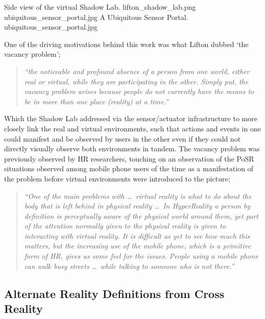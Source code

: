  {Side view of the virtual Shadow Lab.} {lifton_shadow_lab.png}
       {ubiquitous_sensor_portal.jpg} {A Ubiquitous Sensor Portal.} {ubiquitous_sensor_portal.jpg}

One of the driving motivations behind this work was what Lifton dubbed `the vacancy problem';

\begin{quote}
\textit{``the noticeable and profound absence of a person from one world, either real or virtual, while they are participating in the other. Simply put, the vacancy problem arises because people do not currently have the means to be in more than one place (reality) at a time.''}~\cite{Lifton2007a}
\end{quote}

Which the Shadow Lab addressed via the sensor/actuator infrastructure to more closely link the real and virtual environments, such that actions and events in one could manifest and be observed by users in the other even if they could not directly visually observe both environments in tandem. The vacancy problem was previously observed by HR researchers, touching on an observation of the PoSR situations observed among mobile phone users of the time as a manifestation of the problem before virtual environments were introduced to the picture; %

\begin{quote}
	\textit{``One of the main problems with \ldots\ virtual reality is what to do about the body that is left behind in physical reality \ldots\ In HyperReality a person by definition is perceptually aware of the physical world around them, yet part of the attention normally given to the physical reality is given to interacting with virtual reality. It is difficult as yet to see how much this matters, but the increasing use of the mobile phone, which is a primitive form of HR, gives us some feel for the issues. People using a mobile phone can walk busy streets \ldots\ while talking to someone who is not there.''}~\cite{Terashima2001}
\end{quote}


\subsection{Alternate Reality Definitions from Cross Reality}

